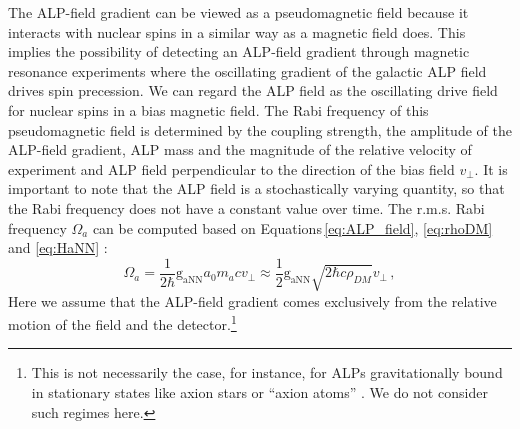\documentclass{WileyMSP-template}
\newcommand{\DK}[1]{\textcolor{brown}{Derek: #1}}
\newcommand{\AW}[1]{\textcolor{cyan}{Arne: #1}}
\begin{document}
	The ALP-field gradient can be viewed as a pseudomagnetic field
	because it interacts with nuclear spins in a similar way as a magnetic field does. 
	This implies the possibility of detecting an ALP-field gradient through magnetic resonance experiments where the oscillating gradient of the galactic ALP field drives spin precession.
	We can regard the ALP field as the oscillating drive field for nuclear spins in a bias magnetic field. 
	The Rabi frequency of this pseudomagnetic field is determined by the coupling strength, 
	the amplitude of the ALP-field gradient, ALP mass and the magnitude of the relative velocity of experiment and ALP field perpendicular to the direction of the bias field $v_{\bot}$. 
	It is important to note that the ALP field is a stochastically varying quantity, so that the Rabi frequency does not have a constant value over time. 
	The r.m.s. Rabi frequency $\Omega_a$ can be computed based on Equations\,\eqref{eq:ALP_field}, \eqref{eq:rhoDM} and \eqref{eq:HaNN} \cite{Centers2021Stochastic}:
	\begin{equation}
		\Omega_a = \dfrac{1}{2\hbar} \mathrm{g_{aNN}} a_0 m_a c v_{\bot} \approx \dfrac{1}{2} \mathrm{g_{aNN}} \sqrt{2\hbar c \rho_{DM}} v_{\bot}
		\,,\label{eq:Omega_a}
	\end{equation}
	Here we assume that the ALP-field gradient comes exclusively from the relative motion of the field and the detector.\footnote{This is not necessarily the case, for instance, for ALPs gravitationally bound %
		in stationary states like axion stars or ``axion atoms'' \cite{Lam2017_PhysRevD, Liang_Zhitnitsky2019_GravitationallyPhysRevD}. We do not consider such regimes here. 
	} 
\end{document}

